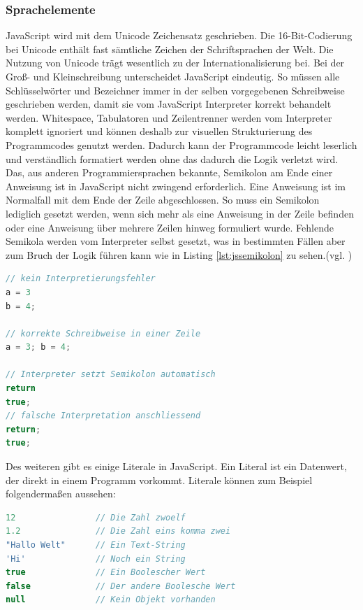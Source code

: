 \subsubsection{Sprachelemente} JavaScript wird mit dem Unicode Zeichensatz geschrieben. Die 16-Bit-Codierung bei Unicode enthält fast sämtliche Zeichen der Schriftsprachen der Welt. Die Nutzung von Unicode trägt wesentlich zu der Internationalisierung bei. Bei der Groß- und Kleinschreibung unterscheidet JavaScript eindeutig. So müssen alle Schlüsselwörter und Bezeichner immer in der selben vorgegebenen Schreibweise geschrieben werden, damit sie vom JavaScript Interpreter korrekt behandelt werden. Whitespace, Tabulatoren und Zeilentrenner werden vom Interpreter komplett ignoriert und können deshalb zur visuellen Strukturierung des Programmcodes genutzt werden. Dadurch kann der Programmcode leicht leserlich und verständlich formatiert werden ohne das dadurch die Logik verletzt wird. Das, aus anderen Programmiersprachen bekannte, Semikolon am Ende einer Anweisung ist in JavaScript nicht zwingend erforderlich. Eine Anweisung ist im Normalfall mit dem Ende der Zeile abgeschlossen. So muss ein Semikolon lediglich gesetzt werden, wenn sich mehr als eine Anweisung in der Zeile befinden oder eine Anweisung über mehrere Zeilen hinweg formuliert wurde. Fehlende Semikola werden vom Interpreter selbst gesetzt, was in bestimmten Fällen aber zum Bruch der Logik führen kann wie in Listing \ref{lst:jssemikolon} zu sehen.(vgl. \cite[S.15ff]{FlanJava2007})

\vspace{1em}
\begin{lstlisting}[language=JavaScript, caption=JavaScript Logikbruch Semikolon, label=lst:jssemikolon]
// kein Interpretierungsfehler
a = 3
b = 4;

// korrekte Schreibweise in einer Zeile
a = 3; b = 4;

// Interpreter setzt Semikolon automatisch
return
true;
// falsche Interpretation anschliessend
return;
true;
\end{lstlisting}

Des weiteren gibt es einige Literale in JavaScript. \glqq Ein Literal ist ein Datenwert, der direkt in einem Programm vorkommt. Literale können zum Beispiel folgendermaßen aussehen:\grqq{}\cite[S.18]{FlanJava2007}

\vspace{1em}
\begin{lstlisting}[language=JavaScript, caption=JavaScript Literale, label=lst:jsliterale]
12                // Die Zahl zwoelf
1.2               // Die Zahl eins komma zwei
"Hallo Welt"      // Ein Text-String
'Hi'              // Noch ein String
true              // Ein Boolescher Wert
false             // Der andere Boolesche Wert
null              // Kein Objekt vorhanden
\end{lstlisting}
	
